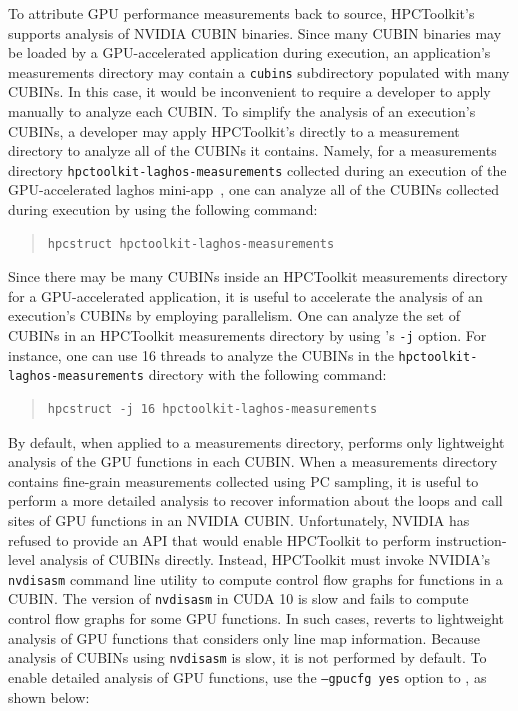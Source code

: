 To  attribute GPU performance measurements back to source, HPCToolkit's \hpcstruct{} supports analysis of NVIDIA CUBIN binaries. Since many CUBIN binaries may be loaded  by a GPU-accelerated application during execution,  an application's measurements directory may contain a {\tt cubins} subdirectory populated with many CUBINs. In this case, it would be inconvenient to require a developer to apply \hpcstruct{} manually to analyze each CUBIN. To simplify the analysis of an execution's CUBINs, a developer may apply HPCToolkit's \hpcstruct{} directly to a measurement directory to analyze all of the CUBINs it contains. Namely, for a measurements directory {\tt hpctoolkit-laghos-measurements} collected during an execution of the GPU-accelerated laghos mini-app~\cite{laghos}, one can analyze all of the CUBINs collected during execution by using the following command:

\begin{quote}
\begin{verbatim}
hpcstruct hpctoolkit-laghos-measurements
\end{verbatim}
\end{quote}


Since there may be many CUBINs inside an HPCToolkit measurements directory for a GPU-accelerated application, it is useful to accelerate the analysis of an execution's CUBINs by employing parallelism. One can analyze the set of CUBINs in an HPCToolkit measurements directory by using \hpcstruct's {\tt -j} option. For instance, one can use 16 threads to analyze the CUBINs in the {\tt hpctoolkit-laghos-measurements} directory with the following command:

\begin{quote}
\begin{verbatim}
hpcstruct -j 16 hpctoolkit-laghos-measurements
\end{verbatim}
\end{quote}

By default, when applied to a measurements directory, \hpcstruct{} performs only lightweight analysis of the GPU functions in each CUBIN. When a measurements directory contains fine-grain measurements collected using PC sampling, it is useful to perform a more detailed analysis to recover information about the loops and call sites of GPU functions in an NVIDIA CUBIN. Unfortunately, NVIDIA has refused to provide an API that would enable HPCToolkit to perform instruction-level analysis of CUBINs directly. Instead, HPCToolkit must invoke NVIDIA's {\tt nvdisasm} command line utility to compute control flow graphs for functions in a CUBIN. The version of {\tt nvdisasm} in CUDA 10 is slow and fails to compute control flow graphs for some GPU functions. In such cases, \hpcstruct{} reverts to lightweight analysis of GPU functions that considers only line map information. Because analysis of CUBINs using {\tt nvdisasm} is slow, it is not performed by default. To enable detailed analysis of GPU functions, use the {\tt --gpucfg yes} option to \hpcstruct{}, as shown below:

